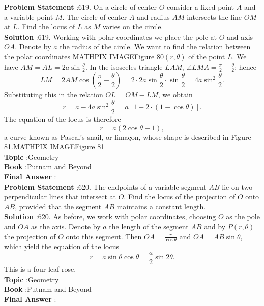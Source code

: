 \documentclass[10pt]{article}
\begin{document}
\textbf{Problem Statement} :619. On a circle of center $O$ consider a fixed point $A$ and a variable point $M$. The circle of center $A$ and radius $A M$ intersects the line $O M$ at $L$. Find the locus of $L$ as $M$ varies on the circle.\\
\textbf{Solution} :619. Working with polar coordinates we place the pole at $O$ and axis $O A$. Denote by $a$ the radius of the circle. We want to find the relation between the polar coordinates MATHPIX IMAGEFigure 80$(r, \theta)$ of the point $L$. We have $A M=A L=2 a \sin \frac{\theta}{2}$. In the isosceles triangle $L A M$, $\angle L M A=\frac{\pi}{2}-\frac{\theta}{2}$; hence$$ L M=2 A M \cos \left(\frac{\pi}{2}-\frac{\theta}{2}\right)=2 \cdot 2 a \sin \frac{\theta}{2} \cdot \sin \frac{\theta}{2}=4 a \sin ^{2} \frac{\theta}{2} . $$Substituting this in the relation $O L=O M-L M$, we obtain$$ r=a-4 a \sin ^{2} \frac{\theta}{2}=a[1-2 \cdot(1-\cos \theta)] . $$The equation of the locus is therefore$$ r=a(2 \cos \theta-1), $$a curve known as Pascal's snail, or limaçon, whose shape is described in Figure 81.MATHPIX IMAGEFigure 81\\
\textbf{Topic} :Geometry\\
\textbf{Book} :Putnam and Beyond\\
\textbf{Final Answer} :\\


\textbf{Problem Statement} :620. The endpoints of a variable segment $A B$ lie on two perpendicular lines that intersect at $O$. Find the locus of the projection of $O$ onto $A B$, provided that the segment $A B$ maintains a constant length.\\
\textbf{Solution} :620. As before, we work with polar coordinates, choosing $O$ as the pole and $O A$ as the axis. Denote by $a$ the length of the segment $A B$ and by $P(r, \theta)$ the projection of $O$ onto this segment. Then $O A=\frac{r}{\cos \theta}$ and $O A=A B \sin \theta$, which yield the equation of the locus$$ r=a \sin \theta \cos \theta=\frac{a}{2} \sin 2 \theta . $$This is a four-leaf rose.\\
\textbf{Topic} :Geometry\\
\textbf{Book} :Putnam and Beyond\\
\textbf{Final Answer} :\\
\end{document}
